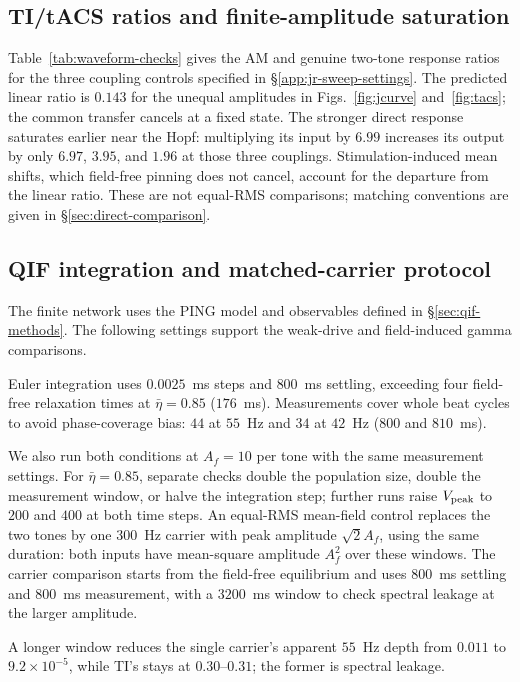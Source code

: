 \documentclass[11pt,a4paper]{article}
\providecommand{\DIFaddtex}[1]{{\protect\color{blue} \sf #1}} %
\providecommand{\DIFadd}[1]{\texorpdfstring{\DIFaddtex{#1}}{#1}} %
\begin{document}
\subsection{\DIFadd{TI/tACS ratios and finite-amplitude saturation}}\label{supp:tacs-saturation}
\DIFadd{Table~\ref{tab:waveform-checks} gives the AM and genuine two-tone response
ratios for the three coupling controls specified in
\S\ref{app:jr-sweep-settings}. The predicted linear ratio is $0.143$ for
the unequal amplitudes in Figs.~\ref{fig:jcurve} and~\ref{fig:tacs}; the
common transfer cancels at a fixed state. The stronger direct response
saturates earlier near the Hopf: multiplying its input by $6.99$ increases
its output by only $6.97$, $3.95$, and $1.96$ at those three couplings.
Stimulation-induced mean shifts, which field-free pinning does not cancel,
account for the departure from the linear ratio. These are not equal-RMS
comparisons; matching conventions are given in \S\ref{sec:direct-comparison}.
}

\subsection{\DIFadd{QIF integration and matched-carrier protocol}}\label{supp:qif-protocol}
\DIFadd{The finite network uses the PING model and observables defined in
\S\ref{sec:qif-methods}. The following settings support the weak-drive and
field-induced gamma comparisons.
}

\DIFadd{Euler integration uses $0.0025$~ms steps and $800$~ms settling, exceeding
four field-free relaxation times at $\bar\eta=0.85$ ($176$~ms).
Measurements cover whole beat cycles to avoid phase-coverage bias:
$44$ at $55$~Hz and $34$ at $42$~Hz ($800$ and $810$~ms).
}

\DIFadd{We also run both conditions at $A_f=10$ per tone with the same measurement
settings. For $\bar\eta=0.85$, separate checks double the population size,
double the measurement window, or halve the integration step; further runs raise
$V_{\rm peak}$ to $200$ and $400$ at both time steps. An equal-RMS
mean-field control replaces the two tones by one $300$~Hz carrier with peak
amplitude $\sqrt{2}A_f$, using the same duration: both inputs have mean-square
amplitude $A_f^2$ over these windows. The carrier comparison starts from the
field-free equilibrium and uses $800$~ms settling and $800$~ms measurement,
with a $3200$~ms window to check spectral leakage at the larger amplitude.
}

\DIFadd{A longer window reduces the single carrier's apparent $55$~Hz
depth from $0.011$ to $9.2\times10^{-5}$, while TI's stays at $0.30$--$0.31$;
the former is spectral leakage.
}
\end{document}
